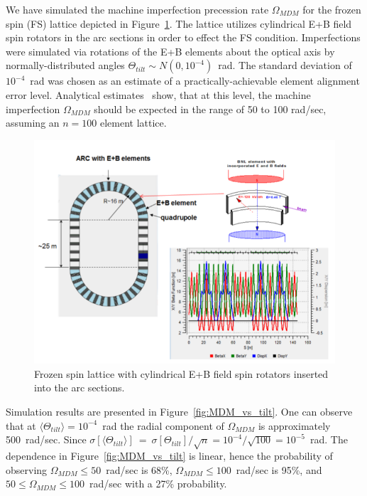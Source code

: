 \documentclass[a4paper]{jpconf}
\newcommand{\avg}[1]{\langle{#1}\rangle}
\newcommand{\W}{\Omega}
\begin{document}
We have simulated the machine imperfection precession rate $\W_{MDM}$ for the frozen spin (FS) lattice depicted in Figure~\ref{fig:Lattice}. The lattice utilizes cylindrical E+B field spin rotators in the arc sections in order to effect the FS condition. Imperfections were simulated via rotations of the E+B elements about the optical axis by normally-distributed angles $\Theta_{tilt}\sim N(0,10^{-4})$~rad. The standard deviation of $10^{-4}$~rad was chosen as an estimate of a practically-achievable element alignment error level. Analytical estimates~\cite{Senichev:FDM} show, that at this level, the machine imperfection $\W_{MDM}$ should be expected in the range of 50 to 100 rad/sec, assuming an $n=100$ element lattice.

\begin{figure}[h]\centering
	\includegraphics[width=.7\linewidth]{Figures/BNL}\hspace{3mm}%
	\begin{minipage}[b]{.2\linewidth}\caption{Frozen spin lattice with cylindrical E+B field spin rotators inserted into the arc sections.\label{fig:Lattice}}
	\end{minipage}
\end{figure}

Simulation results are presented in Figure~\ref{fig:MDM_vs_tilt}. One can observe that at $\avg{\Theta_{tilt}}=10^{-4}$~rad the radial component of $\W_{MDM}$ is approximately 500~rad/sec. 
Since $\sigma[\avg{\Theta_{tilt}}]~=~\sigma[\Theta_{tilt}]/\sqrt{n} = 10^{-4}/\sqrt{100} = 10^{-5}$~rad. The dependence in Figure~\ref{fig:MDM_vs_tilt} is linear, hence the probability of observing $\W_{MDM}\le 50$~rad/sec is 68\%, $\W_{MDM}\le 100$~rad/sec is 95\%, and $50\le\W_{MDM}\le100$~rad/sec with a 27\% probability.
\end{document}
